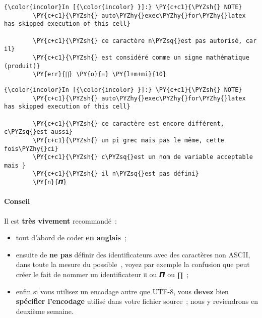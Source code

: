     \begin{Verbatim}[commandchars=\\\{\},frame=single,framerule=0.3mm,rulecolor=\color{cellframecolor}]
{\color{incolor}In [{\color{incolor} }]:} \PY{c+c1}{\PYZsh{} NOTE}
        \PY{c+c1}{\PYZsh{} auto\PYZhy{}exec\PYZhy{}for\PYZhy{}latex has skipped execution of this cell}
        
        \PY{c+c1}{\PYZsh{} ce caractère n\PYZsq{}est pas autorisé, car il}
        \PY{c+c1}{\PYZsh{} est considéré comme un signe mathématique (produit)}
        \PY{err}{∏} \PY{o}{=} \PY{l+m+mi}{10}
\end{Verbatim}


    \begin{Verbatim}[commandchars=\\\{\},frame=single,framerule=0.3mm,rulecolor=\color{cellframecolor}]
{\color{incolor}In [{\color{incolor} }]:} \PY{c+c1}{\PYZsh{} NOTE}
        \PY{c+c1}{\PYZsh{} auto\PYZhy{}exec\PYZhy{}for\PYZhy{}latex has skipped execution of this cell}
        
        \PY{c+c1}{\PYZsh{} ce caractère est encore différent, c\PYZsq{}est aussi}
        \PY{c+c1}{\PYZsh{} un pi grec mais pas le même, cette fois\PYZhy{}ci}
        \PY{c+c1}{\PYZsh{} c\PYZsq{}est un nom de variable acceptable mais }
        \PY{c+c1}{\PYZsh{} il n\PYZsq{}est pas défini}
        \PY{n}{𝞟}
\end{Verbatim}


    \hypertarget{conseil}{%
\paragraph{Conseil}\label{conseil}}

Il est \textbf{très vivement} recommandé~:

\begin{itemize}
\tightlist
\item
  tout d'abord de coder \textbf{en anglais}~;
\item
  ensuite de \textbf{ne pas} définir des identificateurs avec des
  caractères non ASCII, dans toute la mesure du possible~, voyez par
  exemple la confusion que peut créer le fait de nommer un
  identificateur π ou 𝞟 ou ∏~;
\item
  enfin si vous utilisez un encodage autre que UTF-8, vous
  \textbf{devez} bien \textbf{spécifier l'encodage} utilisé dans votre
  fichier source~; nous y reviendrons en deuxième semaine.
\end{itemize}

